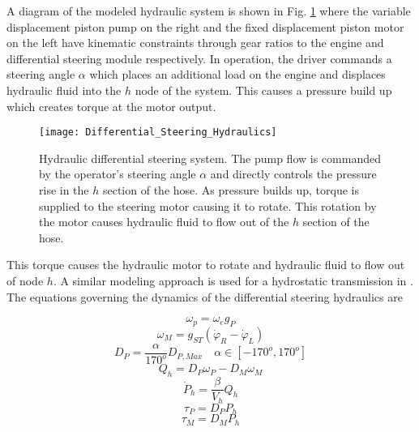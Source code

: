 A diagram of the modeled hydraulic system is shown in Fig. \ref{fig:Differential_Steering_Hydraulics} where the variable displacement piston pump on the right and the fixed displacement piston motor on the left have kinematic constraints through gear ratios to the engine and differential steering module respectively. In operation, the driver commands a steering angle $\alpha$ which places an additional load on the engine and displaces hydraulic fluid into the $h$ node of the system. This causes a pressure build up which creates torque at the motor output.
\begin{figure}[b]
    \centering
    \texttt{[image: Differential\_Steering\_Hydraulics]}
    \caption{Hydraulic differential steering system. The pump flow is commanded by the operator's steering angle $\alpha$ and directly controls the pressure rise in the $h$ section of the hose. As pressure builds up, torque is supplied to the steering motor causing it to rotate. This rotation by the motor causes hydraulic fluid to flow out of the $h$ section of the hose.}
    \vspace{-10pt}
    \label{fig:Differential_Steering_Hydraulics}
\end{figure} 
This torque causes the hydraulic motor to rotate and hydraulic fluid to flow out of node $h$. A similar modeling approach is used for a hydrostatic transmission in \cite{manring1998modeling}. The equations governing the dynamics of the differential steering hydraulics are
\begin{linenomath*}
    \begin{equation}\label{eq:hydraulic_begin}
        \omega_p = \omega_e g_P
    \end{equation}
    \begin{equation}
        \omega_M = g_{ST}(\dot\varphi_R - \dot\varphi_L)
    \end{equation}
    \begin{equation}\label{eq:steerr2pump}
        D_P = \frac{\alpha}{170^o}D_{P,Max} \quad \alpha\in[-170^o, 170^o]
    \end{equation}
    \begin{equation}
        Q_h = D_P\omega_P - D_M\omega_M
    \end{equation}
    \begin{equation}
        \dot P_h = \frac{\beta}{V_h}Q_h
    \end{equation}
    \begin{equation}
        \tau_P = D_PP_h    
    \end{equation}
    \begin{equation}\label{eq:hydraulic_end}
        \tau_M = D_MP_h
    \end{equation}
\end{linenomath*}
